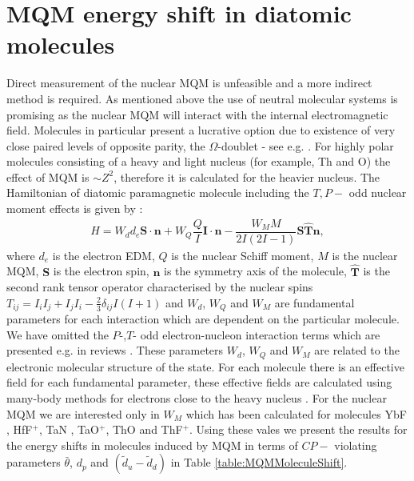 \documentclass[10pt,a4paper, twoside]{report}
\begin{document}
\section{MQM energy shift in diatomic molecules} \label{sec:MQMmolecule}
Direct measurement of the nuclear MQM is unfeasible and a more indirect method is required. As mentioned above the use of neutral molecular systems is promising as the nuclear MQM will interact with the internal electromagnetic field. Molecules in particular present a lucrative option due to existence of very close paired levels of opposite parity, the  $\Omega$-doublet - see e.g.  \cite{Flambaum2014}. For highly polar molecules consisting of a heavy and light nucleus (for example, Th and O) the effect of MQM is $\sim Z^2$, therefore it is calculated for the heavier nucleus. The Hamiltonian of diatomic paramagnetic molecule including the $T, P-$ odd nuclear moment effects is given by \cite{SFK1984,Kozlov1995}:
\begin{align}
H = W_d d_e \mathbf{S}\cdot\mathbf{n} + W_{Q}\dfrac{Q}{I}\mathbf{I}\cdot\mathbf{n} - \dfrac{W_{M}M}{2I(2I -1)}\mathbf{S}\hat{\mathbf{T}}\mathbf{n},
\end{align}
where $d_e$ is the electron EDM, $Q$ is the nuclear Schiff moment, $M$ is the nuclear MQM, $\mathbf{S}$ is the electron spin, $\mathbf{n}$ is the symmetry axis of the molecule, $\hat{\mathbf{T}} $ is the second rank tensor operator characterised by the nuclear spins $T_{ij} = I_iI_j + I_jI_i - \tfrac{2}{3}\delta_{ij}I(I + 1)$  and  $W_d$, $W_Q$ and $W_M$ are fundamental parameters for each interaction which are dependent on the particular molecule. We have omitted the $P$-,$T$- odd electron-nucleon interaction terms which are presented e.g. in reviews \cite{Safronova2017,GF2004}. 
These parameters $W_d$, $W_Q$ and $W_M$
are related to the electronic molecular structure of the state. For each molecule there is an effective field for each fundamental parameter, these effective fields are calculated using many-body methods for electrons close to the heavy nucleus \cite{Flambaum2014}.  For the nuclear MQM we are interested only in $W_M$ which has been calculated for molecules YbF \cite{Kozlov1995}, HfF$^{+}$\cite{Skripnikov2017}, TaN \cite{Skripnikov2015Ta, Fleig2016TaN}, TaO$^+$\cite{Fleig2018}, ThO \cite{Skripnikov2014ThO} and ThF$^+$\cite{Skripnikov2015Th}. 
Using these vales we present the results for the energy shifts in molecules induced by MQM in terms of $CP-$ violating parameters $\bar{\theta}$, $d_p$  and $(\tilde{d}_u -\tilde{d}_d)$ in Table \ref{table:MQMMoleculeShift}. 
\end{document}
